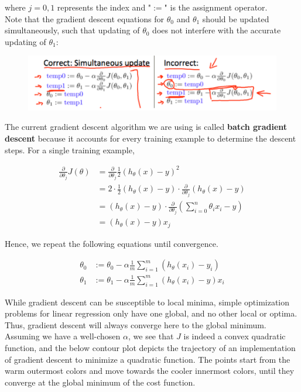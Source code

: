 \noindent where $j=0,1$ represents the index and "$:=$" is the assignment operator. \\

\noindent Note that the gradient descent equations for $\theta_0$ and $\theta_1$ should be updated
simultaneously, such that updating of $\theta_0$ does not interfere with the accurate updating of $\theta_1$:

\begin{figure}[hbt!]
    \centering
    \includegraphics[scale=0.75]{Resources/Simultaneous_Update}
\end{figure}

\noindent The current gradient descent algorithm we are using is called \textbf{batch gradient descent}
because it accounts for every training example to determine the descent steps. For a single training
example,

\begin{align*}
    \frac{\partial}{\partial\theta_j}J(\theta)  &= \frac{\partial}{\partial\theta_j}\frac{1}{2}(h_\theta(x)-y)^2 \\
    &= 2\cdot\frac{1}{2}(h_\theta(x)-y)\cdot
    \frac{\partial}{\partial\theta_j}(h_\theta(x)-y) \\
    &= (h_\theta(x)-y)\cdot\frac{\partial}{\partial\theta_j}
    \left(\sum^n_{i=0}\theta_i x_i-y\right) \\
    &= (h_\theta(x)-y)x_j
\end{align*}

\noindent Hence, we repeat the following equations until convergence.

\begin{align*}
    \theta_0 &:= \theta_0-\alpha\frac{1}{m}\sum^m_{i=1}(h_\theta(x_i)-y_i) \\
    \theta_1 &:= \theta_1-\alpha\frac{1}{m}\sum^m_{i=1}(h_\theta(x_i)-y)x_i
\end{align*}

\noindent While gradient descent can be susceptible to local minima, simple optimization problems for
linear regression only have one global, and no other local or optima. Thus, gradient descent will always
converge here to the global minimum. Assuming we have a well-chosen $\alpha$, we see that $J$ is indeed
a convex quadratic function, and the below contour plot depicts the trajectory of an implementation of
gradient descent to minimize a quadratic function. The points start from the warm outermost colors and
move towards the cooler innermost colors, until they converge at the global minimum of the cost function.

